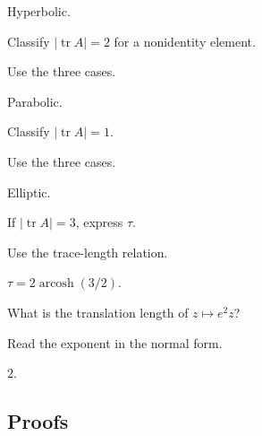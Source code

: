 \begin{solution}
Hyperbolic.
\end{solution}

\begin{exercise}\label{exr:vii34-ped-02}
Classify \(|\operatorname{tr}A|=2\) for a nonidentity element.
\end{exercise}

\begin{hint}
Use the three cases.
\end{hint}

\begin{solution}
Parabolic.
\end{solution}

\begin{exercise}\label{exr:vii34-ped-03}
Classify \(|\operatorname{tr}A|=1\).
\end{exercise}

\begin{hint}
Use the three cases.
\end{hint}

\begin{solution}
Elliptic.
\end{solution}

\begin{exercise}\label{exr:vii34-ped-04}
If \(|\operatorname{tr}A|=3\), express \(\tau\).
\end{exercise}

\begin{hint}
Use the trace-length relation.
\end{hint}

\begin{solution}
\(\tau=2\operatorname{arcosh}(3/2)\).
\end{solution}

\begin{exercise}\label{exr:vii34-ped-05}
What is the translation length of \(z\mapsto e^2z\)?
\end{exercise}

\begin{hint}
Read the exponent in the normal form.
\end{hint}

\begin{solution}
\(2\).
\end{solution}

\subsection*{Proofs}

